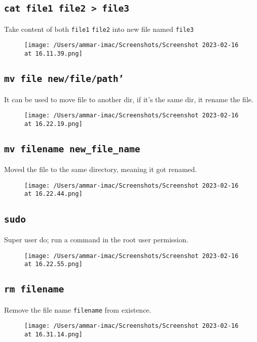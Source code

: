 \documentclass{article}
\def\code#1{\texttt{#1}}
\begin{document}
\subsection{\code{cat file1 file2 > file3}}%
Take content of both \code{file1} \code{file2} into new file named \code{file3}
\begin{figure}[ht]
  \centering
  \texttt{[image: /Users/ammar-imac/Screenshots/Screenshot 2023-02-16 at 16.11.39.png]}
\end{figure}

\newpage


\subsection{\code{mv file new/file/path'}}%
It can be used to move file to another dir, if it's the same dir, it rename the file.
\begin{figure}[ht]
  \centering
  \texttt{[image: /Users/ammar-imac/Screenshots/Screenshot 2023-02-16 at 16.22.19.png]}
\end{figure}

\subsection{\code{mv filename new\_file\_name}}%
Moved the file to the same directory, meaning it got renamed.
\begin{figure}[ht]
  \centering
  \texttt{[image: /Users/ammar-imac/Screenshots/Screenshot 2023-02-16 at 16.22.44.png]}
\end{figure}

\subsection{\code{sudo}}%
Super user do; run a command in the root user permission.
\begin{figure}[ht]
  \centering
  \texttt{[image: /Users/ammar-imac/Screenshots/Screenshot 2023-02-16 at 16.22.55.png]}
\end{figure}

\newpage

\subsection{\code{rm filename}}%
Remove the file name \code{filename} from existence.
\begin{figure}[ht]
  \centering
  \texttt{[image: /Users/ammar-imac/Screenshots/Screenshot 2023-02-16 at 16.31.14.png]}
\end{figure}
\end{document}
